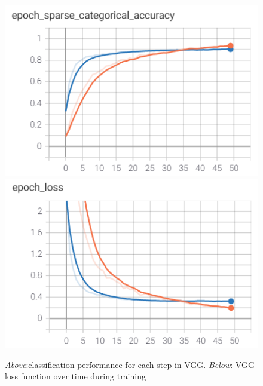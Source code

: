 \begin{figure}
    \centering
    \includegraphics[]{vgg_batch_acc.png}
    \includegraphics[]{vgg_epoch_loss.png}
    \caption{\emph{Above}:classification performance for each step in VGG. \emph{Below}: VGG loss function over time during training}
    \label{fig:vgg_results}
\end{figure}





